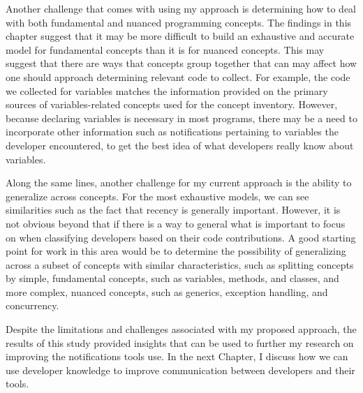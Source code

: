 Another challenge that comes with using my approach is determining how to deal with both fundamental and nuanced programming concepts. The findings in this chapter suggest that it may be more difficult to build an exhaustive and accurate model for fundamental concepts than it is for nuanced concepts. This may suggest that there are ways that concepts group together that can may affect how one should approach determining relevant code to collect. For example, the code we collected for variables matches the information provided on the primary sources of variables-related concepts used for the concept inventory. However, because declaring variables is necessary in most programs, there may be a need to incorporate other information such as notifications pertaining to variables the developer encountered, to get the best idea of what developers really know about variables.

Along the same lines, another challenge for my current approach is the ability to generalize across concepts. For the most exhaustive models, we can see similarities such as the fact that recency is generally important. However, it is not obvious beyond that if there is a way to general what is important to focus on when classifying developers based on their code contributions. A good starting point for work in this area would be to determine the possibility of generalizing across a subset of concepts with similar characteristics, such as splitting concepts by simple, fundamental concepts, such as variables, methods, and classes, and more complex, nuanced concepts, such as generics, exception handling, and concurrency.

Despite the limitations and challenges associated with my proposed approach, the results of this study provided insights that can be used to further my research on improving the notifications tools use. In the next Chapter, I discuss how we can use developer knowledge to improve communication between developers and their tools.